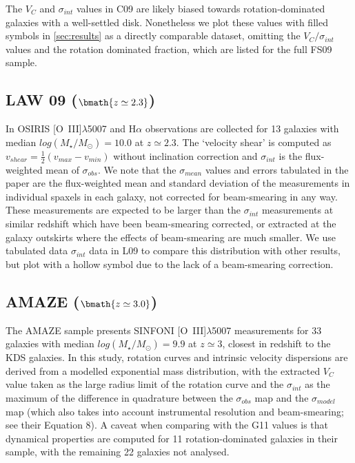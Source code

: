 \documentclass[fleqn,usenatbib]{mnras}
\begin{document}
The $V_{C}$ and $\sigma_{int}$ values in C09 are likely biased towards rotation-dominated galaxies with a well-settled disk.
Nonetheless we plot these values with filled symbols in \cref{sec:results} as a directly comparable dataset, omitting the $V_{C}/\sigma_{int}$ values and the rotation dominated fraction, which are listed for the full FS09 sample.

\subsection{LAW 09 ($\bmath{z\simeq2.3}$)}\label{subsec:law_09}
In \cite[L09]{Law2009} OSIRIS [O~{\sc III}]$\lambda$5007 and H$\alpha$ observations are collected for 13 galaxies with median $log(M_{\star}/M_{\odot})=10.0$ at $z\simeq2.3$.
The `velocity shear' is computed as $v_{shear} = \frac{1}{2}(v_{max} - v_{min})$ without inclination correction and $\sigma_{int}$ is the flux-weighted mean of $\sigma_{obs}$.
We note that the $\sigma_{mean}$ values and errors tabulated in the \cite{Law2009} paper are the flux-weighted mean and standard deviation of the measurements in individual spaxels in each galaxy, not corrected for beam-smearing in any way.
These measurements are expected to be larger than the $\sigma_{int}$ measurements at similar redshift which have been beam-smearing corrected, or extracted at the galaxy outskirts where the effects of beam-smearing are much smaller.
We use tabulated data $\sigma_{int}$ data in L09 to compare this distribution with other results, but plot with a hollow symbol due to the lack of a beam-smearing correction.

\subsection{AMAZE ($\bmath{z\simeq3.0}$)}\label{subsec:AMAZE}
The AMAZE sample \cite[G11]{Gnerucci2011} presents SINFONI [O~{\sc III}]$\lambda$5007 measurements for 33 galaxies with median $log(M_{\star}/M_{\odot})=9.9$ at $z\simeq3$, closest in redshift to the KDS galaxies.
In this study, rotation curves and intrinsic velocity dispersions are derived from a modelled exponential mass distribution, with the extracted $V_{C}$ value taken as the large radius limit of the rotation curve and the $\sigma_{int}$ as the maximum of the difference in quadrature between the $\sigma_{obs}$ map and the $\sigma_{model}$ map (which also takes into account instrumental resolution and beam-smearing; see their Equation 8).
A caveat when comparing with the G11 values is that dynamical properties are computed for 11 rotation-dominated galaxies in their sample, with the remaining 22 galaxies not analysed. \\
\end{document}
